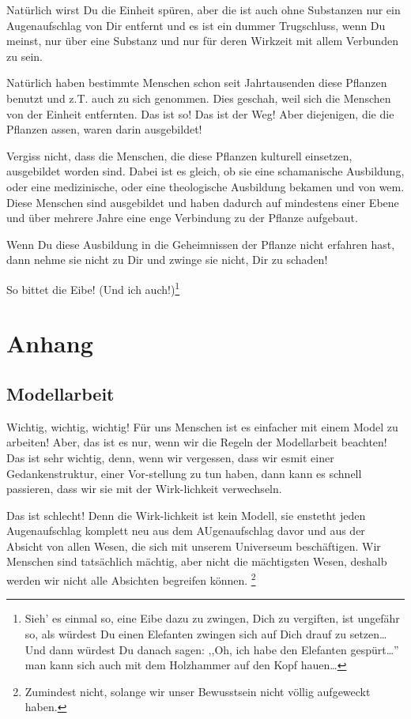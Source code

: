 \documentclass[11pt,titlepage,a5paper]{book}
\begin{document}
Natürlich wirst Du die Einheit spüren, aber die ist auch ohne Substanzen nur ein Augenaufschlag von Dir entfernt und es ist ein dummer Trugschluss, wenn Du meinst, nur über eine Substanz und nur für deren Wirkzeit mit allem Verbunden zu sein.

Natürlich haben bestimmte Menschen schon seit Jahrtausenden diese Pflanzen benutzt und z.T. auch zu sich genommen. Dies geschah, weil sich die Menschen von der Einheit entfernten. Das ist so! Das ist der Weg! Aber diejenigen, die die Pflanzen assen, waren darin ausgebildet!

Vergiss nicht, dass die Menschen, die diese Pflanzen kulturell einsetzen, ausgebildet worden sind. Dabei ist es gleich, ob sie eine schamanische Ausbildung, oder eine medizinische, oder eine theologische Ausbildung bekamen und von wem. Diese Menschen sind ausgebildet und haben dadurch auf mindestens einer Ebene und über mehrere Jahre eine enge Verbindung zu der Pflanze aufgebaut.

Wenn Du diese Ausbildung in die Geheimnissen der Pflanze nicht erfahren hast, dann nehme sie nicht zu Dir und zwinge sie nicht, Dir zu schaden!

So bittet die Eibe! (Und ich auch!)\footnote{Sieh' es einmal so, eine Eibe dazu zu zwingen, Dich zu vergiften, ist ungefähr so, als würdest Du einen Elefanten zwingen sich auf Dich drauf zu setzen\dots Und dann würdest Du danach sagen: ,,Oh, ich habe den Elefanten gespürt\dots '' man kann sich auch mit dem Holzhammer auf den Kopf hauen\dots}




\chapter*{Anhang}


\section*{Modellarbeit }
Wichtig, wichtig, wichtig! Für uns Menschen ist es einfacher mit einem Model zu arbeiten! Aber, das ist es nur, wenn wir die Regeln der Modellarbeit beachten! Das ist sehr wichtig, denn, wenn wir vergessen, dass wir esmit einer Gedankenstruktur, einer Vor-stellung zu tun haben, dann kann es schnell passieren, dass wir sie mit der Wirk-lichkeit verwechseln.

Das ist schlecht! Denn die Wirk-lichkeit ist kein Modell, sie enstetht jeden Augenaufschlag komplett neu aus dem AUgenaufschlag davor und aus der Absicht von allen Wesen, die sich mit unserem Universeum beschäftigen. Wir Menschen sind tatsächlich mächtig, aber nicht die mächtigsten Wesen, deshalb werden wir nicht alle Absichten begreifen können. \footnote{Zumindest nicht, solange wir unser Bewusstsein nicht völlig aufgeweckt haben.}
\end{document}
